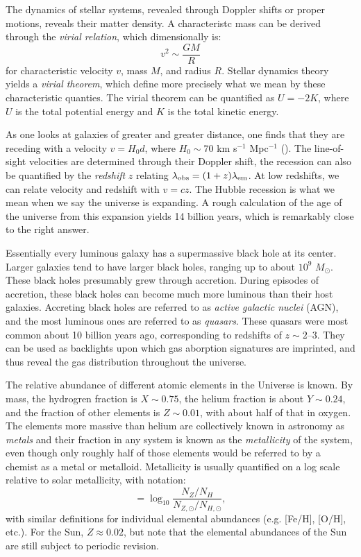 The dynamics of stellar systems, revealed through Doppler shifts or
proper motions, reveals their matter density. A characteristc mass can
be derived through the {\it virial relation}, which dimensionally is:
\begin{equation}
v^2 \sim \frac{GM}{R}
\end{equation}
for characteristic velocity $v$, mass $M$, and radius $R$. Stellar
dynamics theory yields a {\it virial theorem}, which define more
precisely what we mean by these characteristic quanties. The virial
theorem can be quantified as $U = -2 K$, where $U$ is the total
potential energy and $K$ is the total kinetic energy.

As one looks at galaxies of greater and greater distance, one finds
that they are receding with a velocity $v= H_0d$, where $H_0 \sim 70 $
km s$^{-1}$ Mpc$^{-1}$ (\citealt{freedman10a}). The line-of-sight
velocities are determined through their Doppler shift, the recession
can also be quantified by the {\it redshift} $z$ relating
$\lambda_{\rm obs} = (1+z)
\lambda_{\rm em}$. At low redshifts, we can relate velocity and
redshift with $v=cz$. The Hubble recession is what we mean when we say
the universe is expanding. A rough calculation of the age of the
universe from this expansion yields 14 billion years, which is
remarkably close to the right answer.

Essentially every luminous galaxy has a supermassive black hole at its
center. Larger galaxies tend to have larger black holes, ranging up to
about $10^9$ $M_\odot$. These black holes presumably grew through
accretion. During episodes of accretion, these black holes can become
much more luminous than their host galaxies. Accreting black holes are
referred to as {\it active galactic nuclei} (AGN), and the most
luminous ones are referred to as {\it quasars}. These quasars were
most common about 10 billion years ago, corresponding to redshifts of
$z\sim 2$--$3$. They can be used as backlights upon which gas
aborption signatures are imprinted, and thus reveal the gas
distribution throughout the universe.

The relative abundance of different atomic elements in the Universe is
known. By mass, the hydrogren fraction is $X \sim 0.75$, the helium
fraction is about $Y \sim 0.24$, and the fraction of other elements is
$Z \sim 0.01$, with about half of that in oxygen. The elements more
massive than helium are collectively known in astronomy as {\it
metals} and their fraction in any system is known as the {\it
metallicity} of the system, even though only roughly half of those
elements would be referred to by a chemist as a metal or
metalloid. Metallicity is usually quantified on a log scale relative
to solar metallicity, with notation:
\begin{equation}
[Z/H] = \log_{10} \frac{N_Z / N_H}{N_{Z, \odot} /
N_{H, \odot}}, 
\end{equation}
with similar definitions for individual elemental abundances
(e.g. [Fe/H], [O/H], etc.). For the Sun, $Z\approx 0.02$, but note
that the elemental abundances of the Sun are still subject to periodic
revision.

